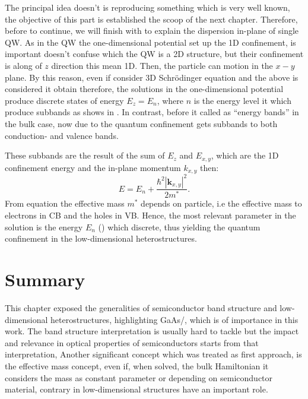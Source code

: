The principal idea doesn't is reproducing something which is very well known, the objective of this part is established the scoop of the next chapter. Therefore,  before to continue, we will finish with to explain the dispersion in-plane of single QW. As in the QW the one-dimensional potential set up the 1D confinement, is important doesn't confuse which the QW is a 2D structure, but their confinement is along of $z$ direction  this mean 1D. Then, the particle can motion in the $x-y$ plane. By this reason, even if consider 3D Schrödinger equation and  the above is considered it obtain 
therefore, the solutions in the one-dimensional potential produce discrete states of energy $E_{z}=E_{n}$\cite{harrison2016quantum}, where $n$ is the energy level it which produce  subbands as shows in . In contrast, before it called as ``energy bands'' in the bulk case, now due to the quantum confinement gets subbands to both conduction- and valence bands.

These subbands are the result of the sum of $E_{z}$ and $E_{x,y}$, which are the 1D confinement energy and the in-plane momentum $k_{x,y}$ then\cite{harrison2016quantum}:
\begin{equation}\label{eqn:chapter-1-total-enery-ema-aprox}		
	E = E_{n} + \dfrac{\hbar^{2}|\boldsymbol{k}_{x,y}|^{2}}{2m^{*}}.
\end{equation}  
From equation the effective mass  $m^*$ depends on particle, i.e the effective mass to electrons in CB and the holes in VB. Hence, the most relevant parameter in the solution is the energy $E_{n}$ () which discrete, thus yielding the quantum confinement in the low-dimensional
heterostructures.


\section{Summary}
\vspace{-10mm} 
This chapter exposed the generalities of semiconductor band structure and low-dimensional
heterostructures, highlighting GaAs/\algaas, which is of importance in this work. The band structure interpretation
is usually hard to tackle  but the impact and relevance in
optical properties of semiconductors starts from that interpretation, Another significant concept which
was treated as first approach, is the effective mass concept, even if, when solved, the bulk
Hamiltonian it considers the mass as constant parameter or depending on semiconductor
material, contrary in low-dimensional structures have an important role.

